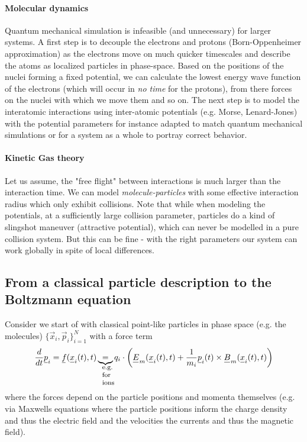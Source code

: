 \paragraph{Molecular dynamics} Quantum mechanical simulation is infeasible (and unnecessary)
for larger systems. A first step is to decouple the electrons and protons (Born-Oppenheimer approximation)
as the electrons move on much quicker timescales and describe the atoms as localized particles in phase-space.
Based on the positions of the nuclei forming a fixed potential, we can calculate the lowest energy wave function
of the electrons (which will occur in \textit{no time} for the protons), from there forces on the nuclei with which
we move them and so on. The next step is to model the interatomic interactions using inter-atomic potentials (e.g. Morse, Lenard-Jones)
with the potential parameters for instance adapted to match quantum mechanical simulations or for a system as a whole to portray
correct behavior.

\paragraph{Kinetic Gas theory} Let us assume, the "free flight" between interactions is much larger
than the interaction time. We can model \textit{molecule-particles} with some effective interaction
radius which only exhibit collisions. Note that while when modeling the potentials, at a sufficiently
large collision parameter, particles do a kind of slingshot maneuver (attractive potential), which
can never be modelled in a pure collision system. But this can be fine - with the right parameters
our system can work globally in spite of local differences. 

\subsection{From a classical particle description to the Boltzmann equation}
\label{subsec:particle_to_boltzmann}

Consider we start of with classical point-like particles in phase space (e.g. the molecules) $\{ \vec{x}_i,\vec{p}_i \}_{i=1}^N$ with a force term
\begin{equation}
    \frac{d}{dt}\vec{p}_i = \vec{f}(\vec{x}_i(t),t) \explain{=}{e.g. for ions} q_i \cdot \left( \vec{E}_m(\vec{x}_i(t),t) + \frac{1}{m_i} \vec{p}_i(t) \times \vec{B}_m (\vec{x}_i(t),t) \right)  
\end{equation}
where the forces depend on the particle positions and momenta themselves (e.g. via Maxwells equations where the particle positions inform the charge
density and thus the electric field and the velocities the currents and thus the magnetic field).

